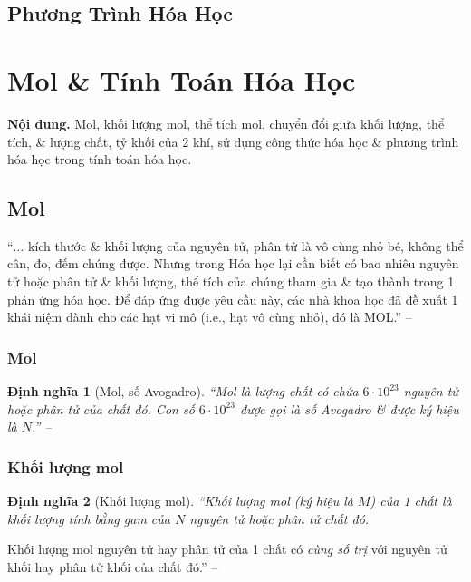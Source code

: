 \documentclass{article}
\numberwithin{equation}{section}
\newtheorem{dinhnghia}{Định nghĩa}[section]
\begin{document}

\subsection{Phương Trình Hóa Học}


\section{Mol \& Tính Toán Hóa Học}
\textsf{\textbf{Nội dung.} Mol, khối lượng mol, thể tích mol, chuyển đổi giữa khối lượng, thể tích, \& lượng chất, tỷ khối của 2 khí, sử dụng công thức hóa học \& phương trình hóa học trong tính toán hóa học.}

\subsection{Mol}
``$\ldots$ kích thước \& khối lượng của nguyên tử, phân tử là vô cùng nhỏ bé, không thể cân, đo, đếm chúng được. Nhưng trong Hóa học lại cần biết có bao nhiêu nguyên tử hoặc phân tử \& khối lượng, thể tích của chúng tham gia \& tạo thành trong 1 phản ứng hóa học. Để đáp ứng được yêu cầu này, các nhà khoa học đã đề xuất 1 khái niệm dành cho các hạt vi mô (i.e., hạt vô cùng nhỏ), đó là MOL.'' -- \cite[p. 63]{SGK_Hoa_Hoc_8}

\subsubsection{Mol}

\begin{dinhnghia}[Mol, số Avogadro]
	``\emph{Mol} là lượng chất có chứa $6\cdot 10^{23}$ nguyên tử hoặc phân tử của chất đó. Con số $6\cdot 10^{23}$ được gọi là \emph{số Avogadro} \& được ký hiệu là $N$.'' -- \cite[p. 63]{SGK_Hoa_Hoc_8}
\end{dinhnghia}

\subsubsection{Khối lượng mol}

\begin{dinhnghia}[Khối lượng mol]
	``\emph{Khối lượng mol} (ký hiệu là $M$) của 1 chất là khối lượng tính bằng gam của $N$ nguyên tử hoặc phân tử chất đó.
\end{dinhnghia}
Khối lượng mol nguyên tử hay phân tử của 1 chất có \textit{cùng số trị} với nguyên tử khối hay phân tử khối của chất đó.'' -- \cite[p. 63]{SGK_Hoa_Hoc_8}
\end{document}
